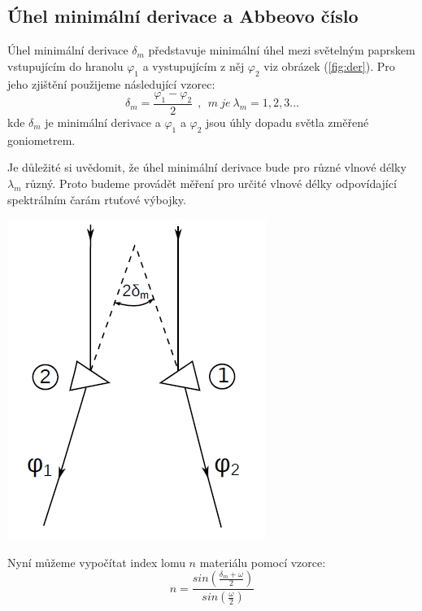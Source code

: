 \documentclass[a4paper,11pt]{article}
\begin{document}
    \hspace{10pt}
    \begin{minipage}[t]{0.5\textwidth} 
        \subsection{Úhel minimální derivace a Abbeovo číslo}
            Úhel minimální derivace $\delta_m$ představuje minimální úhel mezi světelným paprskem vstupujícím do hranolu $\varphi_1$ a vystupujícím z něj $\varphi_2$ viz obrázek (\ref{fig:der}). Pro jeho zjištění použijeme následující vzorec:
            \begin{equation}
                \delta_m = \frac{\varphi_1 - \varphi_2}{2} ~~,~~m~je~\lambda_m=1,2,3...
            \end{equation}
            kde $\delta_m$ je minimální derivace a $\varphi_1$ a $\varphi_2$ jsou úhly dopadu světla změřené goniometrem. 
            \par Je důležité si uvědomit, že úhel minimální derivace bude pro různé vlnové délky $\lambda_m$ různý. Proto budeme provádět měření pro určité vlnové délky odpovídající spektrálním čarám rtuťové výbojky. 
            \vspace{10pt}
            \par 
            \centering
            \includegraphics[scale=0.4]{der}
            \captionsetup{justification=centering, font=footnotesize}
            \label{fig:der}
            \vspace{10pt}
            \raggedright
            \par Nyní můžeme vypočítat index lomu $n$ materiálu pomocí vzorce:
            \begin{equation}
                n = \frac{sin\left(\frac{\delta_m + \omega}{2}\right)}{sin\left(\frac{\omega}{2}\right)}
            \end{equation}
    \end{minipage}
\end{document}
